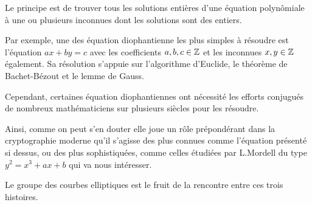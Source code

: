 Le principe est de trouver tous les solutions entières d'une équation polynômiale à une ou
plusieurs inconnues dont les solutions sont des entiers.

Par exemple, une des équation diophantienne les plus simples à résoudre est l'équation $ax+by = c$ avec
les coefficients $a,b,c \in \mathbb{Z}$ et les inconnues $x,y \in \mathbb{Z}$ également. Sa résolution s'appuie
sur l'algorithme d'Euclide, le théorème de Bachet-Bézout et le lemme de Gauss.

Cependant, certaines équation diophantiennes ont nécessité les efforts conjugués de nombreux
mathématiciens sur plusieurs siècles pour les résoudre.

Ainsi, comme on peut s'en douter elle joue un rôle prépondérant dans la
cryptographie moderne qu'il s'agisse des plus connues comme l'équation présenté si dessus, ou
des plus sophistiquées, comme celles étudiées par L.Mordell du type $y^2 = x^3 + ax+b$ qui va
nous intéresser.

Le groupe des courbes elliptiques est le fruit de la rencontre entre ces trois
histoires.










